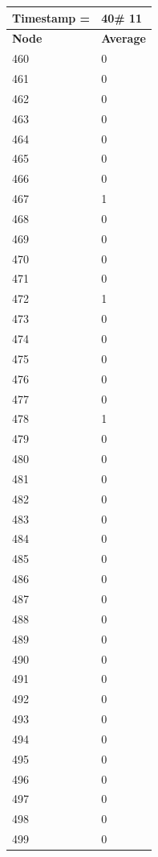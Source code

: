 \begin{tabular}{|l||l|}
\hline
\textbf{Timestamp =} & \textbf{40}\# 11\\\hline
	\textbf{Node} & \textbf{Average} \\ \hline
\hline
	460 & 0 \\ \hline
	461 & 0 \\ \hline
	462 & 0 \\ \hline
	463 & 0 \\ \hline
	464 & 0 \\ \hline
	465 & 0 \\ \hline
	466 & 0 \\ \hline
	467 & 1 \\ \hline
	468 & 0 \\ \hline
	469 & 0 \\ \hline
	470 & 0 \\ \hline
	471 & 0 \\ \hline
	472 & 1 \\ \hline
	473 & 0 \\ \hline
	474 & 0 \\ \hline
	475 & 0 \\ \hline
	476 & 0 \\ \hline
	477 & 0 \\ \hline
	478 & 1 \\ \hline
	479 & 0 \\ \hline
	480 & 0 \\ \hline
	481 & 0 \\ \hline
	482 & 0 \\ \hline
	483 & 0 \\ \hline
	484 & 0 \\ \hline
	485 & 0 \\ \hline
	486 & 0 \\ \hline
	487 & 0 \\ \hline
	488 & 0 \\ \hline
	489 & 0 \\ \hline
	490 & 0 \\ \hline
	491 & 0 \\ \hline
	492 & 0 \\ \hline
	493 & 0 \\ \hline
	494 & 0 \\ \hline
	495 & 0 \\ \hline
	496 & 0 \\ \hline
	497 & 0 \\ \hline
	498 & 0 \\ \hline
	499 & 0 \\ \hline
\end{tabular}

